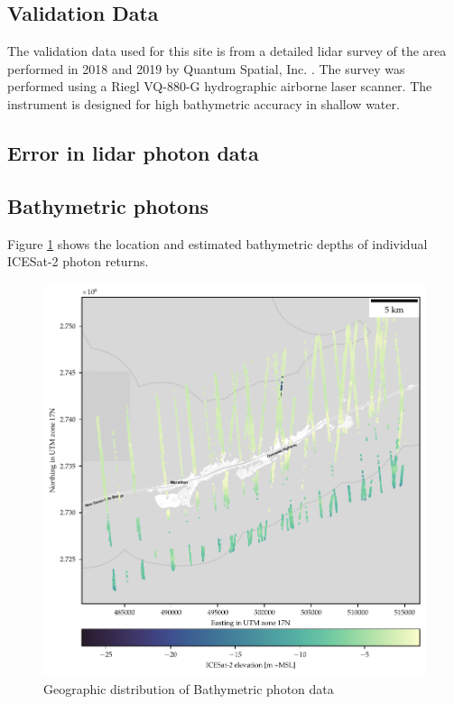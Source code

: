 \subsection{Validation Data}
The validation data used for this site is from a detailed lidar survey of the area performed in 2018 and 2019 by Quantum Spatial, Inc. \parencite{Keys2019Lidar}. The survey was performed using a Riegl VQ-880-G hydrographic airborne laser scanner. The instrument is designed for high bathymetric accuracy in shallow water.
\subsection{Error in lidar photon data}

% 

% 

\subsection{Bathymetric photons}
Figure \ref{fig:bathyphotonmap} shows the location and estimated bathymetric depths of individual ICESat-2 photon returns.
\begin{figure}[h]
    \centering
    \includegraphics[width=\textwidth]{figures/Florida_keys_photon_map.pdf}
    \caption{Geographic distribution of Bathymetric photon data}
    \label{fig:bathyphotonmap}
\end{figure}

